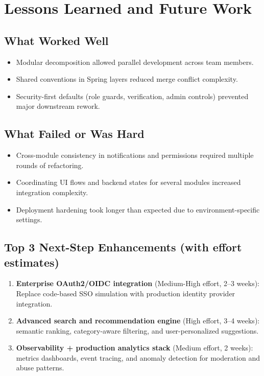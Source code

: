 \documentclass[12pt,a4paper]{article}
\begin{document}
\section{Lessons Learned and Future Work}

\subsection{What Worked Well}
\begin{itemize}[leftmargin=*]
    \item Modular decomposition allowed parallel development across team members.
    \item Shared conventions in Spring layers reduced merge conflict complexity.
    \item Security-first defaults (role guards, verification, admin controls) prevented major downstream rework.
\end{itemize}

\subsection{What Failed or Was Hard}
\begin{itemize}[leftmargin=*]
    \item Cross-module consistency in notifications and permissions required multiple rounds of refactoring.
    \item Coordinating UI flows and backend states for several modules increased integration complexity.
    \item Deployment hardening took longer than expected due to environment-specific settings.
\end{itemize}

\subsection{Top 3 Next-Step Enhancements (with effort estimates)}
\begin{enumerate}[leftmargin=*]
    \item \textbf{Enterprise OAuth2/OIDC integration} (Medium-High effort, 2--3 weeks): Replace code-based SSO simulation with production identity provider integration.
    \item \textbf{Advanced search and recommendation engine} (High effort, 3--4 weeks): semantic ranking, category-aware filtering, and user-personalized suggestions.
    \item \textbf{Observability + production analytics stack} (Medium effort, 2 weeks): metrics dashboards, event tracing, and anomaly detection for moderation and abuse patterns.
\end{enumerate}
\end{document}
